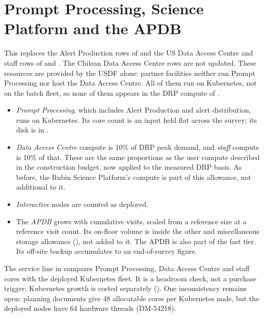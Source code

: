 \section{Prompt Processing, Science Platform and the APDB}\label{sec:upservices}

This replaces the Alert Production rows of  and
the US Data Access Centre and staff rows of  and
. The Chilean Data Access Centre rows are not
updated. These resources are provided by the USDF alone: partner facilities
neither run Prompt Processing nor host the Data Access Centre. All of them
run on Kubernetes, not on the batch fleet, so none of them appears in the DRP
compute of .

\begin{itemize}
\item \emph{Prompt Processing}, which includes Alert Production and alert
      distribution, runs on Kubernetes. Its core count is an input held flat
      across the survey; its disk is in .
\item \emph{Data Access Centre} compute is 10\% of DRP peak demand, and
      \emph{staff} compute is 10\% of that. These are the same proportions as
      the user compute described in the construction budget, now applied to
      the measured DRP basis. As before, the Rubin Science Platform's compute
      is part of this allowance, not additional to it.
\item \emph{Interactive} nodes are counted as deployed.
\item The \emph{APDB} grows with cumulative visits, scaled from a reference
      size at a reference visit count. Its on-floor volume is inside the other
      and miscellaneous storage allowance (), not added
      to it. The APDB is also part of the fast tier. Its off-site backup
      accumulates to an end-of-survey figure.
\end{itemize}

The service line in  compares Prompt Processing, Data
Access Centre and staff cores with the deployed Kubernetes fleet. It is a
headroom check, not a purchase trigger; Kubernetes growth is costed
separately (). One inconsistency remains open: planning
documents give 48 allocatable cores per Kubernetes node, but the deployed
nodes have 64 hardware threads (DM-54218).



\begin{landscape}

\end{landscape}
